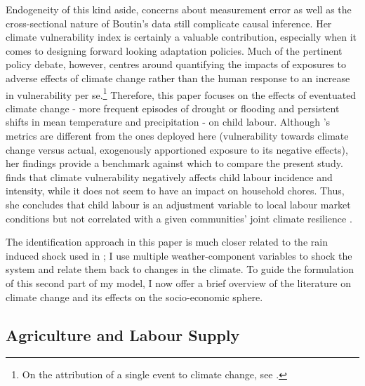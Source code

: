 \documentclass[a4paper,12pt]{article}
\theoremstyle{plain}
\theoremstyle{definition}
\theoremstyle{definition}
\theoremstyle{definition}
\theoremstyle{definition}
\begin{document}
Endogeneity of this kind aside, concerns about measurement error as well as the cross-sectional nature of Boutin's data still complicate causal inference. Her climate vulnerability index is certainly a valuable contribution, especially when it comes to designing forward looking adaptation policies. Much of the pertinent policy debate, however, centres around quantifying the impacts of exposures to adverse effects of climate change rather than the human response to an increase in vulnerability per se.\footnote{On the attribution of a single event to climate change, see \citet{Hansen2014}.} Therefore, this paper focuses on the effects of eventuated climate change - more frequent episodes of drought or flooding and persistent shifts in mean temperature and precipitation - on child labour. Although \citeauthor{Boutin2014}'s metrics are different from the ones deployed here (vulnerability towards climate change versus actual, exogenously apportioned exposure to its negative effects), her findings provide a benchmark against which to compare the present study. \citeauthor{Boutin2014} finds that climate vulnerability negatively affects child labour incidence and intensity, while it does not seem to have an impact on household chores. Thus, she concludes that child labour is an adjustment variable to local labour market conditions but not correlated with a given communities’ joint climate resilience \citep{Boutin2014}. 

The identification approach in this paper is much closer related to the rain induced shock used in \citet{Dumas2020}; I use multiple weather-component variables to shock the system and relate them back to changes in the climate. To guide the formulation of this second part of my model, I now offer a brief overview of the literature on climate change and its effects on the socio-economic sphere. 

\subsection{Agriculture and Labour Supply}
\label{sub:agriculture_and_labour_supply}
\end{document}
